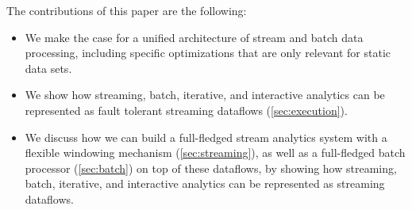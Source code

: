 \vspace{2mm}
\noindent The contributions of this paper are the following:\vspace{-2mm}
\begin{itemize}
	\item We make the case for a unified architecture of stream and batch data processing, including specific optimizations that are only relevant for static data sets.
	\vspace{-3mm}
	\item We show how streaming, batch, iterative, and interactive analytics can be represented as fault tolerant streaming dataflows (\autoref{sec:execution}).
	\vspace{-3mm}
	\item We discuss how we can build a full-fledged stream analytics system with a flexible windowing mechanism (\autoref{sec:streaming}), as well as a full-fledged batch processor (\autoref{sec:batch}) on top of these dataflows, by showing how streaming, batch, iterative, and interactive analytics can be represented as streaming dataflows.
\end{itemize}